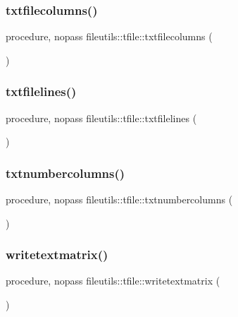 \subsubsection{\texorpdfstring{txtfilecolumns()}{txtfilecolumns()}}
{\footnotesize\ttfamily procedure, nopass fileutils\+::tfile\+::txtfilecolumns (\begin{DoxyParamCaption}{ }\end{DoxyParamCaption})\hspace{0.3cm}{\ttfamily [private]}}

\mbox{\label{structfileutils_1_1tfile_ae6a4e80338d3c54f7af28d151e68f9fe}} 
\subsubsection{\texorpdfstring{txtfilelines()}{txtfilelines()}}
{\footnotesize\ttfamily procedure, nopass fileutils\+::tfile\+::txtfilelines (\begin{DoxyParamCaption}{ }\end{DoxyParamCaption})\hspace{0.3cm}{\ttfamily [private]}}

\mbox{\label{structfileutils_1_1tfile_ae39f35cb46467e4f7c7b2a6333760ff4}} 
\subsubsection{\texorpdfstring{txtnumbercolumns()}{txtnumbercolumns()}}
{\footnotesize\ttfamily procedure, nopass fileutils\+::tfile\+::txtnumbercolumns (\begin{DoxyParamCaption}{ }\end{DoxyParamCaption})\hspace{0.3cm}{\ttfamily [private]}}

\mbox{\label{structfileutils_1_1tfile_addc8b3930c4ae32a925e508a26519797}} 
\subsubsection{\texorpdfstring{writetextmatrix()}{writetextmatrix()}}
{\footnotesize\ttfamily procedure, nopass fileutils\+::tfile\+::writetextmatrix (\begin{DoxyParamCaption}{ }\end{DoxyParamCaption})\hspace{0.3cm}{\ttfamily [private]}}

